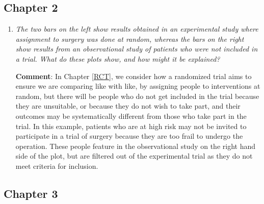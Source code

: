 \documentclass{krantz}
\begin{document}
\hypertarget{chapter-2}{%
\subsection{Chapter 2}\label{chapter-2}}

\begin{enumerate}
\def\labelenumi{\arabic{enumi}.}
\setcounter{enumi}{1}
\item
  \emph{The two bars on the left show results obtained in an experimental study where assignment to surgery was done at random, whereas the bars on the right show results from an observational study of patients who were not included in a trial. What do these plots show, and how might it be explained?}

  \textbf{Comment}: In Chapter \ref{RCT}, we consider how a randomized trial aims to ensure we are comparing like with like, by assigning people to interventions at random, but there will be people who do not get included in the trial because they are unsuitable, or because they do not wish to take part, and their outcomes may be systematically different from those who take part in the trial. In this example, patients who are at high risk may not be invited to participate in a trial of surgery because they are too frail to undergo the operation. These people feature in the observational study on the right hand side of the plot, but are filtered out of the experimental trial as they do not meet criteria for inclusion.
\end{enumerate}

\hypertarget{chapter-3}{%
\subsection{Chapter 3}\label{chapter-3}}
\end{document}
